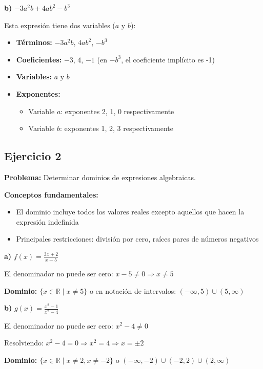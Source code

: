 \textbf{b)} $-3a^2b + 4ab^2 - b^3$

Esta expresión tiene dos variables ($a$ y $b$):

\begin{itemize}
    \item \textbf{Términos:} $-3a^2b$, $4ab^2$, $-b^3$
    \item \textbf{Coeficientes:} $-3$, $4$, $-1$ (en $-b^3$, el coeficiente implícito es -1)
    \item \textbf{Variables:} $a$ y $b$
    \item \textbf{Exponentes:}
    \begin{itemize}
        \item Variable $a$: exponentes 2, 1, 0 respectivamente
        \item Variable $b$: exponentes 1, 2, 3 respectivamente
    \end{itemize}
\end{itemize}

\subsection*{Ejercicio 2}

\textbf{Problema:} Determinar dominios de expresiones algebraicas.

\textbf{Conceptos fundamentales:}
\begin{itemize}
    \item El dominio incluye todos los valores reales excepto aquellos que hacen la expresión indefinida
    \item Principales restricciones: división por cero, raíces pares de números negativos
\end{itemize}

\textbf{a)} $f(x) = \frac{3x + 2}{x - 5}$

El denominador no puede ser cero: $x - 5 \neq 0 \Rightarrow x \neq 5$

\textbf{Dominio:} $\{x \in \mathbb{R} \mid x \neq 5\}$ o en notación de intervalos: $(-\infty, 5) \cup (5, \infty)$

\textbf{b)} $g(x) = \frac{x^2 - 1}{x^2 - 4}$

El denominador no puede ser cero: $x^2 - 4 \neq 0$

Resolviendo: $x^2 - 4 = 0 \Rightarrow x^2 = 4 \Rightarrow x = \pm 2$

\textbf{Dominio:} $\{x \in \mathbb{R} \mid x \neq 2, x \neq -2\}$ o $(-\infty, -2) \cup (-2, 2) \cup (2, \infty)$

